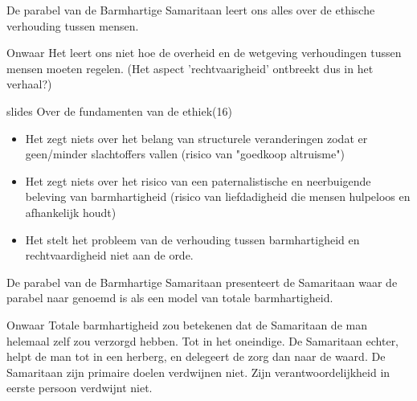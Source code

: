 \documentclass[main.tex]{subfiles}
\begin{document}
\begin{examenvraag}
    \begin{stelling}
        De parabel van de Barmhartige Samaritaan leert ons alles over de ethische verhouding tussen mensen.
    \end{stelling}


    \begin{stelling-antwoord}{Onwaar}
    	Het leert ons niet hoe de overheid en de wetgeving verhoudingen tussen mensen moeten regelen. (Het aspect 'rechtvaarigheid' ontbreekt dus in het verhaal?)
        \begin{citaat}{slides Over de fundamenten van de ethiek(16)}
            \begin{itemize}
                \item Het zegt niets over het belang van structurele veranderingen zodat er geen/minder slachtoffers vallen (risico van "goedkoop altruisme")
                \item Het zegt niets over het risico van een paternalistische en neerbuigende beleving van barmhartigheid (risico van liefdadigheid die mensen hulpeloos en afhankelijk houdt)
                \item Het stelt het probleem van de verhouding tussen barmhartigheid en rechtvaardigheid niet aan de orde.
            \end{itemize}
        \end{citaat}
    \end{stelling-antwoord}

\end{examenvraag}


\begin{examenvraag}
    \begin{stelling}
        De parabel van de Barmhartige Samaritaan presenteert de Samaritaan waar de parabel naar genoemd is als een model van totale barmhartigheid.
    \end{stelling}

    \begin{stelling-antwoord}{Onwaar}
        Totale barmhartigheid zou betekenen dat de Samaritaan de man helemaal zelf zou verzorgd hebben.
        Tot in het oneindige.
        De Samaritaan echter, helpt de man tot in een herberg, en delegeert de zorg dan naar de waard.
        De Samaritaan zijn primaire doelen verdwijnen niet.
        Zijn verantwoordelijkheid in eerste persoon verdwijnt niet.
    \end{stelling-antwoord}
\end{examenvraag}
\end{document}
